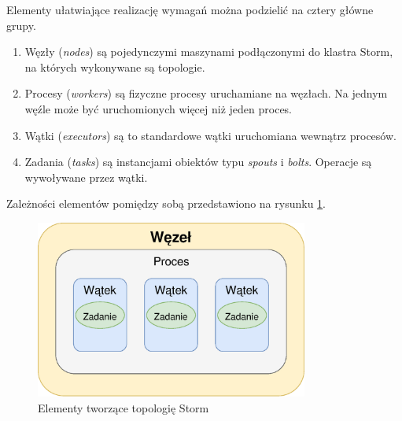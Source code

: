 Elementy ułatwiające realizację wymagań można podzielić na cztery główne grupy.
\begin{enumerate}
  \item Węzły (\textit{nodes}) są pojedynczymi maszynami podłączonymi do klastra Storm,
  na których wykonywane są topologie.
  \item Procesy (\textit{workers}) są fizyczne procesy uruchamiane na węzłach.
  Na jednym węźle może być uruchomionych więcej niż jeden proces.
  \item Wątki (\textit{executors}) są to standardowe wątki uruchomiana wewnątrz procesów.
  \item Zadania (\textit{tasks}) są instancjami obiektów typu \textit{spouts} i \textit{bolts}.
  Operacje są wywoływane przez wątki.
\end{enumerate}
Zależności elementów pomiędzy sobą przedstawiono na rysunku \ref{fig:StormParallel}.
\begin{figure}[htbp]
  \centering
  \includegraphics[width=0.8\textwidth]{img/stormElements}
  \caption{Elementy tworzące topologię Storm}
  \label{fig:StormParallel}
\end{figure}

